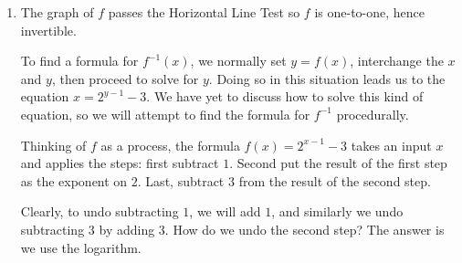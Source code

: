 \documentclass{ximera}
\begin{document}
\begin{example}
\begin{explanation}
\begin{enumerate}
Looking point-by-point, we have  $\left(-1, \frac{1}{2}\right) \rightarrow \left(0, \frac{1}{2}\right) \rightarrow \left(0, -\frac{5}{2}\right)$,  $(0,1)  \rightarrow (1,1)  \rightarrow  (1,-2)$, and, finally, $(1, 2) \rightarrow (2, 2) \rightarrow (2, -1)$.  The horizontal asymptote is affected only by the vertical shift, $y = 0 \rightarrow y = -3$.  

The desmos interactive below graphs both the starting function $g(x) = 2^{x}$ and the transformed function  $f(x) = g(x-1)-3 = 2^{x-1} - 3$.  Here instead of tracking the key points and graph through each transformation discretely, we are presented with a full array of parameters from Theorem \ref{transformationsthm} with which to continuously transform the graph of $g$ into the graph.

Rewriting $f(x) =  g(x-1)-3 =  (1) g((1)x - 1) + (-3)$, we see the two parameters which need adjusting are $h$ and $k$.

Using the sliders, adjust $h$ from $0$ to $1$.  This moves the graph of $g$ gradually to the right $1$ unit.  Adjusting $k$ from $0$ to $-3$ moves the graph down $3$ units.  The key points move along with the graph so we have a nice graphical check of our work above.

\begin{center}
\end{center}

From the graph of $f$, we get the domain is $(-\infty, \infty)$ and the range is $(-3, \infty)$.

\item  The graph of $f$ passes the Horizontal Line Test so $f$ is one-to-one, hence invertible.  

To find a formula for $f^{-1}(x)$, we normally set $y=f(x)$, interchange the $x$ and $y$, then proceed to solve for $y$.  Doing so in this situation leads us to the equation $x = 2^{y-1}-3$.  We have yet to discuss how to solve this kind of equation, so we will attempt to find the formula for $f^{-1}$ procedurally.  

Thinking of $f$ as a process, the formula $f(x) = 2^{x-1}-3$ takes an input $x$ and applies the steps: first subtract $1$.   Second put the result of the first step as the exponent on $2$.   Last, subtract $3$ from the result of the second step.

 

Clearly, to undo subtracting $1$, we will add $1$, and similarly we undo subtracting $3$ by adding $3$.  How do we undo the second step?  The answer is we use the logarithm.  


\end{enumerate}
\end{explanation}
\end{example}
\end{document}
